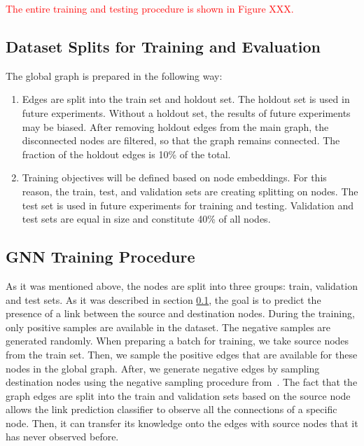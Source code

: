 \documentclass[a4paper,twoside]{article}
\begin{document}
\textcolor{red}{The entire training and testing procedure is shown in Figure XXX.}

\subsection{Dataset Splits for Training and Evaluation}\label{sec:splits}

The global graph is prepared in the following way:
\begin{enumerate}
    \item Edges are split into the train set and holdout set. The holdout set is used in future experiments. Without a holdout set, the results of future experiments may be biased. After removing holdout edges from the main graph, the disconnected nodes are filtered, so that the graph remains connected. The fraction of the holdout edges is 10\% of the total.
    \item Training objectives will be defined based on node embeddings. For this reason, the train, test, and validation sets are creating splitting on nodes. The test set is used in future experiments for training and testing. Validation and test sets are equal in size and constitute 40\% of all nodes.
\end{enumerate}

\subsection{GNN Training Procedure}\label{sec:gnn_training}

As it was mentioned above, the nodes are split into three groups: train, validation and test sets. As it was described in section \ref{sec:splits}, the goal is to predict the presence of a link between the source and destination nodes. During the training, only positive samples are available in the dataset. The negative samples are generated randomly. When preparing a batch for training, we take source nodes from the train set. Then, we sample the positive edges that are available for these nodes in the global graph. After, we generate negative edges by sampling destination nodes using the negative sampling procedure from~\cite{mikolov2013distributed}. The fact that the graph edges are split into the train and validation sets based on the source node allows the link prediction classifier to observe all the connections of a specific node. Then, it can transfer its knowledge onto the edges with source nodes that it has never observed before.
\end{document}
